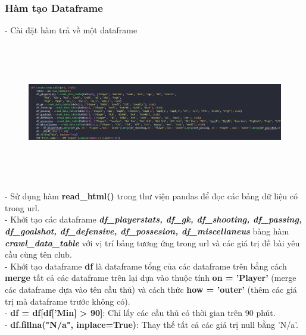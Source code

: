 \subsubsection{Hàm tạo Dataframe}
    - Cài đặt hàm trả về một dataframe\\
    \begin{figure}[H]
        \centering
        \includegraphics[width=1\textwidth, height=6cm]{img/tao_bang.png}
    \end{figure}
    - Sử dụng hàm \textbf{read\_html()} trong thư viện pandas để đọc các bảng dữ liệu có trong url.\\
    - Khởi tạo các dataframe \textbf{\textit{df\_playerstats, df\_gk, df\_shooting, df\_passing, df\_goalshot, df\_defensive, df\_possesion, df\_miscellaneus}} bàng hàm \textbf{\textit{crawl\_data\_table}} với vị trí bảng tương ứng trong url và các giá trị đề bài yêu cầu cùng tên club.\\
    - Khởi tạo dataframe \textbf{df} là dataframe tổng của các dataframe trên bằng cách \textbf{merge} tất cả các dataframe trên lại dựa vào thuộc tính \textbf{on = 'Player'} (merge các dataframe dựa vào tên cầu thủ) và cách thức \textbf{how = 'outer'} (thêm các giá trị mà dataframe trước không có).\\
    - \textbf{df = df[df['Min] > 90]}: Chỉ lấy các cầu thủ có thời gian trên 90 phút.\\
    - \textbf{df.fillna("N/a", inplace=True)}: Thay thế tất cả các giá trị null bằng 'N/a'.\\
